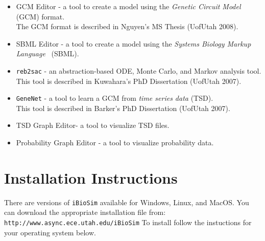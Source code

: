 \documentclass[titlepage,11pt]{article}
\begin{document}
\begin{itemize}
\item GCM Editor - a tool to create a model using the 
\emph{Genetic Circuit Model} (GCM) format.\\ 
The GCM format is described in
Nguyen's MS Thesis
(UofUtah 2008).
\item SBML Editor - a tool to create a model using the 
\emph{Systems Biology Markup Language}
~(SBML). 
\item {\tt reb2sac} - an abstraction-based ODE, Monte Carlo, and Markov analysis tool.
\\
This tool is described in 
Kuwahara's PhD Dissertation
(UofUtah 2007).
\item {\tt GeneNet} - a tool to learn a GCM from \emph{time series
    data} (TSD).\\
This tool is described in 
Barker's PhD Dissertation
(UofUtah 2007).
\item TSD Graph Editor- a tool to visualize TSD files. 
\item Probability Graph Editor - a tool to visualize probability data. 
\end{itemize}

\section{Installation Instructions}

\noindent
There are versions of {\tt iBioSim} available for Windows, Linux, and
MacOS.  You can download the appropriate installation file from:\\
{\tt http://www.async.ece.utah.edu/iBioSim}
To install follow the instuctions for your operating system below.
\end{document}

